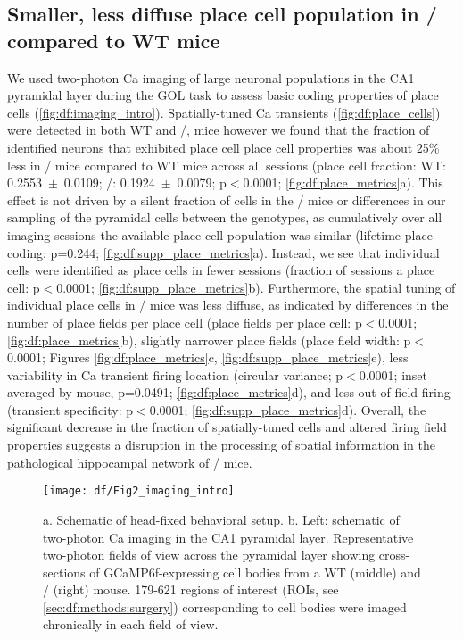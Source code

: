 \subsection{Smaller, less diffuse place cell population in \df/ compared to WT mice}

We used two-photon Ca imaging of large neuronal populations in the CA1 pyramidal layer during the GOL task to assess basic coding properties of place cells (\autoref{fig:df:imaging_intro}). Spatially-tuned Ca transients \citep{Dombeck2007} (\autoref{fig:df:place_cells}) were detected in both WT and \df/, mice however we found that the fraction of identified neurons that exhibited place cell place cell properties was about 25\% less in \df/ mice compared to WT mice across all sessions (place cell fraction: WT: 0.2553~$\pm$~0.0109; \df/: 0.1924~$\pm$~0.0079; p$<$0.0001; \autoref{fig:df:place_metrics}a).  This effect is not driven by a silent fraction of cells in the \df/ mice or differences in our sampling of the pyramidal cells between the genotypes, as cumulatively over all imaging sessions the available place cell population was similar (lifetime place coding: p=0.244; \autoref{fig:df:supp_place_metrics}a). Instead, we see that individual cells were identified as place cells in fewer sessions (fraction of sessions a place cell: p$<$0.0001; \autoref{fig:df:supp_place_metrics}b). Furthermore, the spatial tuning of individual place cells in \df/ mice was less diffuse, as indicated by differences in the number of place fields per place cell (place fields per place cell: p$<$0.0001; \autoref{fig:df:place_metrics}b), slightly narrower place fields (place field width: p$<$0.0001; Figures \ref{fig:df:place_metrics}c, \autoref{fig:df:supp_place_metrics}e), less variability in Ca transient firing location (circular variance; p$<$0.0001; inset averaged by mouse, p=0.0491; \autoref{fig:df:place_metrics}d), and less out-of-field firing (transient specificity: p$<$0.0001; \autoref{fig:df:supp_place_metrics}d).
Overall, the significant decrease in the fraction of spatially-tuned cells and altered firing field properties suggests a disruption in the processing of spatial information in the pathological hippocampal network of \df/ mice.

\begin{figure}
	\centering
	\texttt{[image: df/Fig2\_imaging\_intro]}
	\caption[Schematic of head-fixed setup and example fields of view]{a. Schematic of head-fixed behavioral setup.
	b. Left: schematic of two-photon Ca imaging in the CA1 pyramidal layer. Representative two-photon fields of view across the pyramidal layer showing cross-sections of GCaMP6f-expressing cell bodies from a WT (middle) and \df/ (right) mouse. 179-621 regions of interest (ROIs, see \autoref{sec:df:methods:surgery}) corresponding to cell bodies were imaged chronically in each field of view.}
	\label{fig:df:imaging_intro}
\end{figure}

